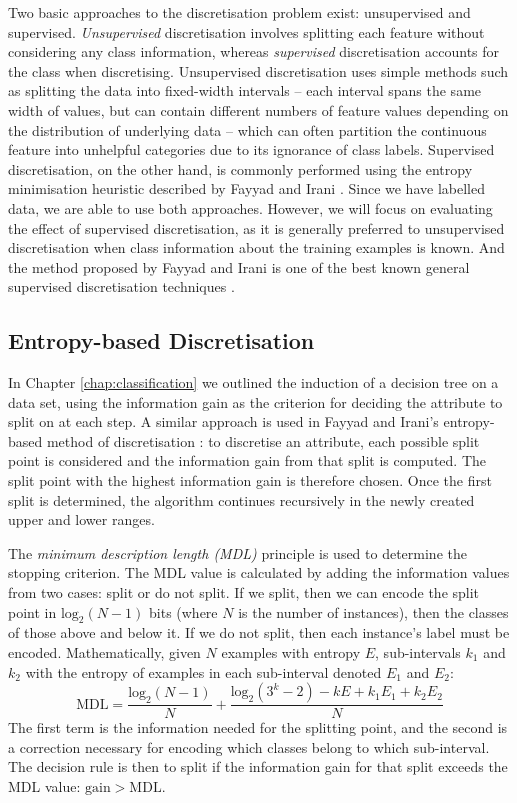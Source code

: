 Two basic approaches to the discretisation problem exist: unsupervised and
supervised. \textit{Unsupervised} discretisation involves splitting each
feature without considering any class information, whereas \textit{supervised}
discretisation accounts for the class when discretising.
Unsupervised discretisation uses simple methods such as splitting the data into
fixed-width intervals -- each interval spans the same width of values,
but can contain different numbers of feature values depending on the
distribution of underlying data -- which
can often partition the continuous feature into unhelpful categories due to its
ignorance of class labels. Supervised discretisation, on the
other hand, is commonly performed using the entropy minimisation heuristic
described by Fayyad and Irani \cite{Fayyad1993}. Since we have labelled
data, we are able to use both approaches. However, we will focus on evaluating
the effect of supervised discretisation, as it is generally preferred to
unsupervised discretisation when class information about the training examples
is known. And the method proposed by Fayyad and Irani is one of the best known
general supervised discretisation techniques \cite{Witten2005}.

\subsection{Entropy-based Discretisation}
In Chapter \ref{chap:classification} we outlined the induction of a decision
tree on a data set, using the information gain as the criterion for deciding
the attribute to split on at each step. A similar approach is used in Fayyad
and Irani's entropy-based method of discretisation \cite{Fayyad1993}:
to discretise an attribute,
each possible split point is considered and the information gain from that
split is computed. The split point with the highest information gain is
therefore chosen. Once the first split is determined, the algorithm continues
recursively in the newly created upper and lower ranges.

The \textit{minimum description length (MDL)} principle is used to determine
the stopping criterion. The MDL value is calculated by adding the information
values from two cases: split or do not split. If we split, then we can encode
the split point in $\mathrm{log}_2(N-1)$ bits (where $N$ is the number of
instances), then the classes of those above and below it. If we do not split,
then each instance's label must be encoded. Mathematically, given $N$ examples
with entropy $E$, sub-intervals $k_1$ and $k_2$ with the entropy of examples
in each sub-interval denoted $E_1$ and $E_2$:
\begin{equation*}
\mathrm{MDL} = \dfrac{\mathrm{log}_2(N-1)}{N} + \dfrac{\mathrm{log}_2(3^k-2) - kE + k_1E_1 + k_2E_2}{N}
\end{equation*}
The first term is the information needed for the splitting point, and the
second is a correction necessary for encoding which classes belong to which
sub-interval. The decision rule is then to split if the information gain for
that split exceeds the MDL value: $\mathrm{gain} > \mathrm{MDL}$.

